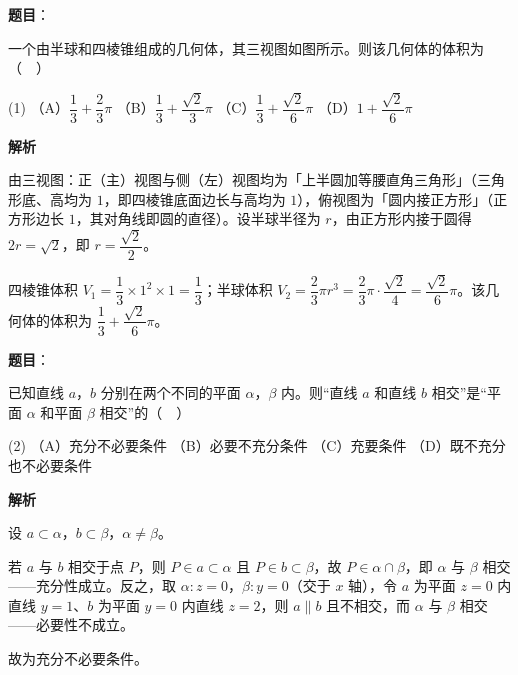 \begin{answer}

\textbf{题目}：

一个由半球和四棱锥组成的几何体，其三视图如图所示。则该几何体的体积为（　）
\nopagebreak[4]
\begin{center}\end{center}
\nopagebreak[4]
\begin{gkopts}(1)
\task （A）\(\dfrac{1}{3}+\dfrac{2}{3}\pi\)
\task （B）\(\dfrac{1}{3}+\dfrac{\sqrt{2}}{3}\pi\)
\task （C）\(\dfrac{1}{3}+\dfrac{\sqrt{2}}{6}\pi\)
\task （D）\(1+\dfrac{\sqrt{2}}{6}\pi\)
\end{gkopts}

\textbf{解析}

由三视图：正（主）视图与侧（左）视图均为「上半圆加等腰直角三角形」（三角形底、高均为 \(1\)，即四棱锥底面边长与高均为 \(1\)），俯视图为「圆内接正方形」（正方形边长 \(1\)，其对角线即圆的直径）。设半球半径为 \(r\)，由正方形内接于圆得 \(2r=\sqrt{2}\)，即 \(r=\dfrac{\sqrt{2}}{2}\)。

四棱锥体积 \(V_{1}=\dfrac{1}{3}\times 1^{2}\times 1=\dfrac{1}{3}\)；半球体积 \(V_{2}=\dfrac{2}{3}\pi r^{3}=\dfrac{2}{3}\pi\cdot\dfrac{\sqrt{2}}{4}=\dfrac{\sqrt{2}}{6}\pi\)。该几何体的体积为 \(\dfrac{1}{3}+\dfrac{\sqrt{2}}{6}\pi\)。


\end{answer}
\begin{answer}

\textbf{题目}：

已知直线 \(a\)，\(b\) 分别在两个不同的平面 \(\alpha\)，\(\beta\) 内。则“直线 \(a\) 和直线 \(b\) 相交”是“平面 \(\alpha\) 和平面 \(\beta\) 相交”的（　）

\begin{gkopts}(2)
\task （A）充分不必要条件
\task （B）必要不充分条件
\task （C）充要条件
\task （D）既不充分也不必要条件
\end{gkopts}

\textbf{解析}

设 \(a\subset\alpha\)，\(b\subset\beta\)，\(\alpha\ne\beta\)。

若 \(a\) 与 \(b\) 相交于点 \(P\)，则 \(P\in a\subset\alpha\) 且 \(P\in b\subset\beta\)，故 \(P\in\alpha\cap\beta\)，即 \(\alpha\) 与 \(\beta\) 相交——充分性成立。反之，取 \(\alpha:z=0\)，\(\beta:y=0\)（交于 \(x\) 轴），令 \(a\) 为平面 \(z=0\) 内直线 \(y=1\)、\(b\) 为平面 \(y=0\) 内直线 \(z=2\)，则 \(a\parallel b\) 且不相交，而 \(\alpha\) 与 \(\beta\) 相交——必要性不成立。

故为充分不必要条件。


\end{answer}
